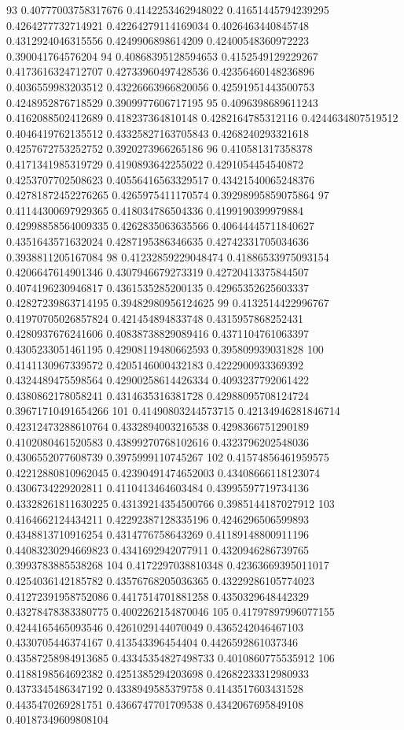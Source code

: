 93 0.40777003758317676 0.4142253462948022 0.41651445794239295 0.4264277732714921 0.42264279114169034 0.4026463440845748 0.4312924046315556 0.4249906898614209 0.42400548360972223 0.390041764576204
94 0.40868395128594653 0.4152549129229267 0.4173616324712707 0.42733960497428536 0.42356460148236896 0.4036559983203512 0.43226663966820056 0.42591951443500753 0.4248952876718529 0.3909977606717195
95 0.4096398689611243 0.4162088502412689 0.418237364810148 0.4282164785312116 0.4244634807519512 0.4046419762135512 0.43325827163705843 0.4268240293321618 0.4257672753252752 0.3920273966265186
96 0.410581317358378 0.4171341985319729 0.4190893642255022 0.4291054454540872 0.4253707702508623 0.40556416563329517 0.43421540065248376 0.42781872452276265 0.4265975411170574 0.39298995859075864
97 0.41144300697929365 0.418034786504336 0.4199190399979884 0.42998858564009335 0.4262835063635566 0.40644445711840627 0.4351643571632024 0.4287195386346635 0.42742331705034636 0.3938811205167084
98 0.41232859229048474 0.41886533975093154 0.4206647614901346 0.4307946679273319 0.42720413375844507 0.4074196230946817 0.4361535285200135 0.42965352625603337 0.42827239863714195 0.39482980956124625
99 0.4132514422996767 0.41970705026857824 0.421454894833748 0.4315957868252431 0.4280937676241606 0.40838738829089416 0.4371104761063397 0.4305233051461195 0.42908119480662593 0.395809939031828
100 0.4141130967339572 0.4205146000432183 0.4222900933369392 0.4324489475598564 0.42900258614426334 0.4093237792061422 0.4380862178058241 0.4314635316381728 0.42988095708124724 0.39671710491654266
101 0.41490803244573715 0.42134946281846714 0.42312473288610764 0.4332894003216538 0.4298366751290189 0.4102080461520583 0.43899270768102616 0.4323796202548036 0.4306552077608739 0.3975999110745267
102 0.41574856461959575 0.42212880810962045 0.42390491474652003 0.43408666118123074 0.4306734229202811 0.4110413464603484 0.43995597719734136 0.43328261811630225 0.43139214354500766 0.3985144187027912
103 0.4164662124434211 0.42292387128335196 0.4246296506599893 0.4348813710916254 0.4314776758643269 0.41189148800911196 0.44083230294669823 0.4341692942077911 0.4320946286739765 0.3993783885538268
104 0.4172297038810348 0.42363669395011017 0.4254036142185782 0.43576768205036365 0.43229286105774023 0.41272391958752086 0.4417514701881258 0.4350329648442329 0.43278478383380775 0.4002262154870046
105 0.41797897996077155 0.4244165465093546 0.4261029144070049 0.4365242046467103 0.4330705446374167 0.413543396454404 0.4426592861037346 0.43587258984913685 0.43345354827498733 0.4010860775535912
106 0.4188198564692382 0.4251385294203698 0.42682233312980933 0.4373345486347192 0.4338949585379758 0.4143517603431528 0.4435470269281751 0.4366747701709538 0.4342067695849108 0.40187349609808104
